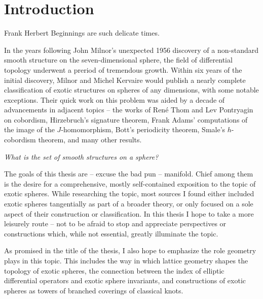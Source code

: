\chapter{Introduction}\label{chap:introduction}

\begin{epigraph}{16em}{Frank Herbert}
	Beginnings are such delicate times.
\end{epigraph}


In the years following John Milnor's unexpected 1956 discovery of a non-standard smooth structure on the seven-dimensional sphere, the field of differential topology underwent a preriod of tremendous growth. Within six years of the initial discovery, Milnor and Michel Kervaire would publish a nearly complete classification of exotic structures on spheres of any dimensions, with some notable exceptions. 
Their quick work on this problem was aided by a decade of advancements in adjacent topics -- the works of Ren\'e Thom and Lev Pontryagin on cobordism, Hirzebruch's signature theorem, Frank Adams' computations of the image of the $J$-homomorphism, Bott's periodicity theorem, Smale's $h$-cobordism theorem, and many other results. 


\begin{center}
  \textsl{What is the set of smooth structures on a sphere?}
\end{center}

The goals of this thesis are -- excuse the bad pun -- manifold. Chief among them is the desire for a comprehensive, mostly self-contained exposition to the topic of exotic spheres. While researching the topic, most sources I found either included exotic spheres tangentially as part of a broader theory, or only focused on a sole aspect of their construction or classification.
In this thesis I hope to take a more leisurely route -- not to be afraid to stop and appreciate perspectives or constructions which, while not essential, greatly illuminate the topic.

As promised in the title of the thesis, I also hope to emphasize the role geometry plays in this topic.
This includes the way in which lattice geometry shapes the topology of exotic spheres, the connection between the index of elliptic differential operators and exotic sphere invariants, and constructions of exotic spheres as towers of branched coverings of classical knots. 

